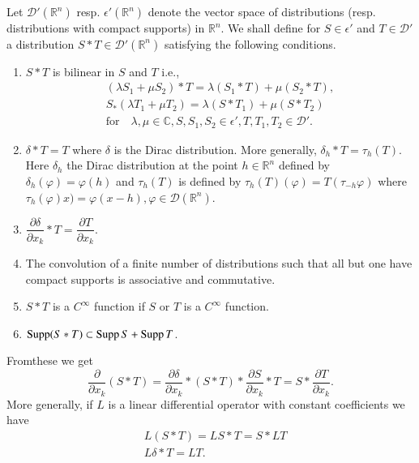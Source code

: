 Let $\mathcal{D}'(\mathbb{R}^{n})$ resp. $\epsilon'(\mathbb{R}^{n})$ denote the vector space of distributions (resp. distributions with compact supports) in $\mathbb{R}^{n}$. We shall define for $S\in \epsilon'$ and $T\in \mathcal{D}'$ a distribution $S\ast T\in \mathcal{D}'(\mathbb{R}^{n})$ satisfying the following conditions.
\begin{enumerate}
\renewcommand{\labelenumi}{(\theenumi)}
\item $S\ast T$ is bilinear in $S$ and $T$ i.e.,
\begin{gather*}
(\lambda S_{1}+\mu S_{2})\ast T=\lambda (S_{1}\ast T)+\mu (S_{2}\ast T),\\[3pt]
S_{\ast}(\lambda T_{1}+\mu T_{2})=\lambda (S\ast T_{1})+\mu (S\ast T_{2})\\[3pt]
\text{for}\quad \lambda, \mu\in \mathbb{C}, S, S_{1},S_{2}\in \epsilon', T, T_{1}, T_{2}\in \mathcal{D}'.
\end{gather*}

\item $\delta \ast T=T$ where $\delta$ is the Dirac distribution. More generally, $\delta_{h}\ast T=\tau_{h}(T)$. Here $\delta_{h}$ the Dirac distribution at the point $h\in \mathbb{R}^{n}$ defined by $\delta_{h}(\varphi)=\varphi(h)$ and $\tau_{h}(T)$ is defined by $\tau_{h}(T)(\varphi)=T(\tau_{-h}\varphi)$ where $\tau_{h}(\varphi)x)=\varphi(x-h),\varphi\in \mathcal{D}(\mathbb{R}^{n})$.

\item $\dfrac{\partial \delta}{\partial x_{k}}\ast T=\dfrac{\partial T}{\partial x_{k}}$.

\item The convolution of a finite number of distributions such that all but one have compact supports is associative and commutative.

\item $S\ast T$ is a $C^{\infty}$ function if $S$ or $T$ is a $C^{\infty}$ function.

\item $\operatorname{Supp} (S\ast T)\subset \operatorname{Supp} S+\operatorname{Supp} T$.
\end{enumerate}

From\pageoriginale these we get
$$
\frac{\partial}{\partial x_{k}}(S\ast T)=\dfrac{\partial \delta}{\partial x_{k}}\ast (S\ast T)\ast \dfrac{\partial S}{\partial x_{k}}\ast T=S\ast \dfrac{\partial T}{\partial x_{k}}.
$$
More generally, if $L$ is a linear differential operator with constant coefficients we have
\begin{align*}
& L(S\ast T)=LS\ast T=S\ast LT\\[3pt]
& L\delta \ast T=LT.
\end{align*}

